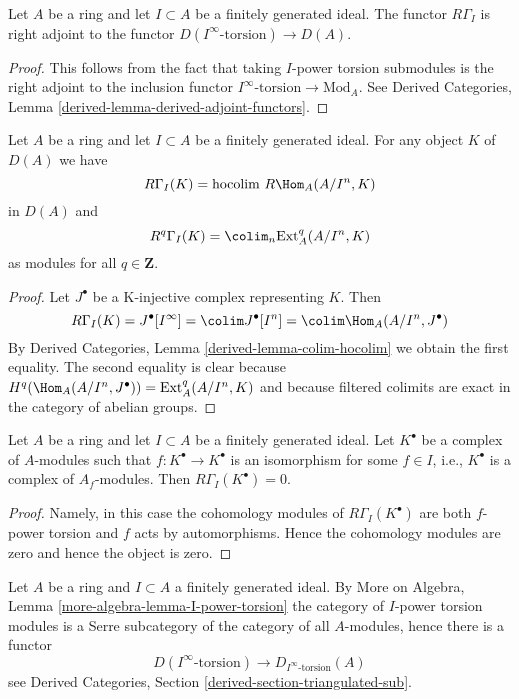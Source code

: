 \begin{lemma}
\label{lemma-adjoint}
Let $A$ be a ring and let $I \subset A$ be a finitely generated ideal.
The functor $R\Gamma_I$ is right adjoint to the functor
$D(I^\infty\text{-torsion}) \to D(A)$.
\end{lemma}

\begin{proof}
This follows from the fact that taking $I$-power torsion submodules
is the right adjoint to the inclusion functor
$I^\infty\text{-torsion} \to \text{Mod}_A$. See
Derived Categories, Lemma \ref{derived-lemma-derived-adjoint-functors}.
\end{proof}

\begin{lemma}
\label{lemma-local-cohomology-ext}
Let $A$ be a ring and let $I \subset A$ be a finitely generated ideal.
For any object $K$ of $D(A)$ we have
$$
R\Gamma_I(K) = \text{hocolim}\ R\Hom_A(A/I^n, K)
$$
in $D(A)$ and
$$
R^q\Gamma_I(K) = \colim_n \text{Ext}_A^q(A/I^n, K)
$$
as modules for all $q \in \mathbf{Z}$.
\end{lemma}

\begin{proof}
Let $J^\bullet$ be a K-injective complex representing $K$.
Then
$$
R\Gamma_I(K) = J^\bullet[I^\infty] = \colim J^\bullet[I^n] =
\colim \Hom_A(A/I^n, J^\bullet)
$$
By Derived Categories, Lemma \ref{derived-lemma-colim-hocolim}
we obtain the first equality. The second equality is clear
because $H^q(\Hom_A(A/I^n, J^\bullet)) = \text{Ext}^q_A(A/I^n, K)$
and because filtered colimits are exact in the category of abelian
groups.
\end{proof}

\begin{lemma}
\label{lemma-bad-local-cohomology-vanishes}
Let $A$ be a ring and let $I \subset A$ be a finitely generated ideal.
Let $K^\bullet$ be a complex of $A$-modules such that
$f : K^\bullet \to K^\bullet$ is an isomorphism for some
$f \in I$, i.e., $K^\bullet$ is a complex of $A_f$-modules. Then
$R\Gamma_I(K^\bullet) = 0$.
\end{lemma}

\begin{proof}
Namely, in this case the cohomology modules of $R\Gamma_I(K^\bullet)$
are both $f$-power torsion and $f$ acts by automorphisms. Hence the
cohomology modules are zero and hence the object is zero.
\end{proof}

\noindent
Let $A$ be a ring and $I \subset A$ a finitely generated ideal.
By More on Algebra, Lemma \ref{more-algebra-lemma-I-power-torsion}
the category of $I$-power torsion modules is a Serre subcategory
of the category of all $A$-modules, hence there is a functor
\begin{equation}
\label{equation-compare-torsion}
D(I^\infty\text{-torsion}) \to D_{I^\infty\text{-torsion}}(A)
\end{equation}
see Derived Categories, Section \ref{derived-section-triangulated-sub}.

